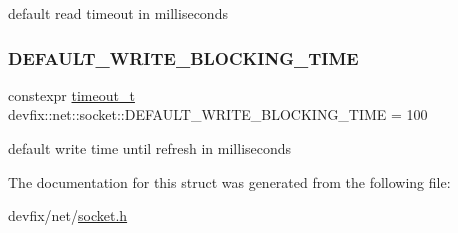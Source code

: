default read timeout in milliseconds 

\mbox{\label{structdevfix_1_1net_1_1socket_a57ab1333bbc83d51468d33e11042f107}} 
\subsubsection{\texorpdfstring{D\+E\+F\+A\+U\+L\+T\+\_\+\+W\+R\+I\+T\+E\+\_\+\+B\+L\+O\+C\+K\+I\+N\+G\+\_\+\+T\+I\+ME}{DEFAULT\_WRITE\_BLOCKING\_TIME}}
{\footnotesize\ttfamily constexpr \hyperlink{structdevfix_1_1net_1_1socket_a80a3bf4cb7292bae31ea9c6575539c68}{timeout\+\_\+t} devfix\+::net\+::socket\+::\+D\+E\+F\+A\+U\+L\+T\+\_\+\+W\+R\+I\+T\+E\+\_\+\+B\+L\+O\+C\+K\+I\+N\+G\+\_\+\+T\+I\+ME = 100\hspace{0.3cm}{\ttfamily [static]}}



default write time until refresh in milliseconds 



The documentation for this struct was generated from the following file\+:\begin{DoxyCompactItemize}
\item 
devfix/net/\hyperlink{socket_8h}{socket.\+h}\end{DoxyCompactItemize}
